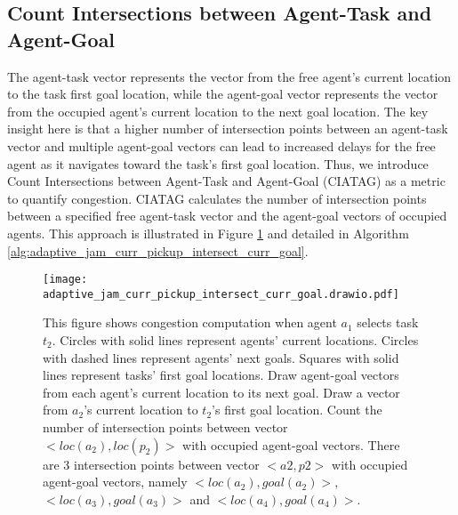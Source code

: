 \documentclass[letterpaper]{article} %
\begin{document}
\begin{comment}
    \STATE $congestion$ := number of agents' next goals in the task-agent circle. 

    \end{algorithmic}
\end{algorithm}

\end{comment}

\subsection{Count Intersections between Agent-Task and Agent-Goal}\label{sec:adaptive_jam_curr_pickup_intersect_curr_goal}

The agent-task vector represents the vector from the free agent's current location to the task first goal location, 
while the agent-goal vector represents the vector from the occupied agent's current location to the next goal location. 
The key insight here is that a higher number of intersection points between an agent-task vector and multiple agent-goal vectors can lead to increased delays for the free agent as it navigates toward the task's first goal location.  
Thus, we introduce Count Intersections between Agent-Task and Agent-Goal (CIATAG) as a metric to quantify congestion. 
CIATAG calculates the number of intersection points between a specified free agent-task vector and the agent-goal vectors of occupied agents.
This approach is illustrated in Figure \ref{fig:adaptive_jam_curr_pickup_intersect_curr_goal} and detailed in Algorithm \ref{alg:adaptive_jam_curr_pickup_intersect_curr_goal}. 

\begin{figure}[t]
    \centering
    \texttt{[image: adaptive\_jam\_curr\_pickup\_intersect\_curr\_goal.drawio.pdf]}
    \caption{This figure shows congestion computation when agent $a_1$ selects task $t_2$. 
    Circles with solid lines represent agents' current locations.
    Circles with dashed lines represent agents' next goals.
    Squares with solid lines represent tasks' first goal locations.
    Draw agent-goal vectors from each agent's current location to its next goal. 
    Draw a vector from $a_2$'s current location to $t_2$'s first goal location. 
    Count the number of intersection points between vector $<loc(a_2), loc(p_2)>$ with occupied agent-goal vectors. 
    There are 3 intersection points between vector $<a2, p2>$ with occupied agent-goal vectors, namely $<loc(a_2),goal(a_2)>$, $<loc(a_3),goal(a_3)>$ and $<loc(a_4),goal(a_4)>$.
    }
    \label{fig:adaptive_jam_curr_pickup_intersect_curr_goal}
\end{figure}
\end{document}
